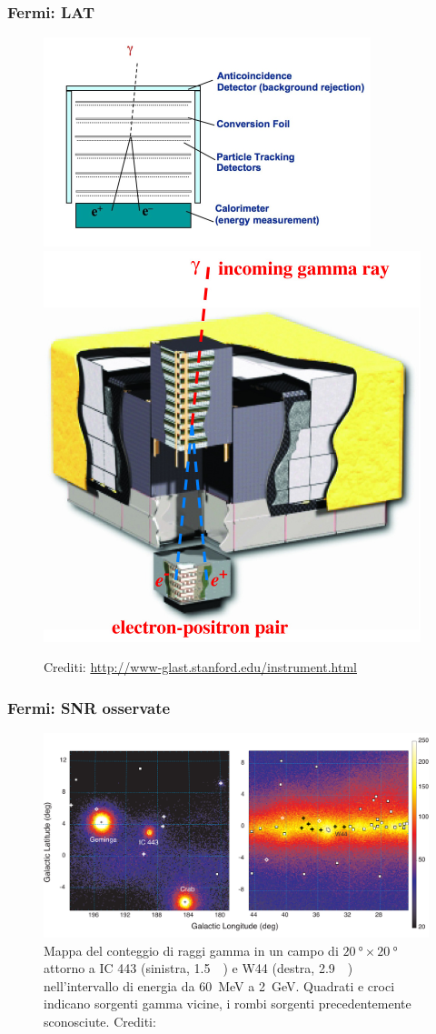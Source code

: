 \documentclass[10pt]{beamer}
\begin{document}
\begin{frame}
  \frametitle{Fermi: LAT}
  \begin{figure}
    \centering
    \includegraphics[width=0.6\columnwidth]{Gamma_telescope_schematic}
    \includegraphics[width=0.4\columnwidth]{f1}
    \caption{Crediti: \url{http://www-glast.stanford.edu/instrument.html}}
  \end{figure}
\end{frame}

\begin{frame}
  \frametitle{Fermi: SNR osservate}
  \begin{figure}
    \centering
    \includegraphics[width=0.8\columnwidth]{1231160fig1.pdf}
    \caption{Mappa del conteggio di raggi gamma in un campo di
      $\SI{20}{\degree} \times \SI{20}{\degree}$ attorno a IC 443 (sinistra,
      \SI{1.5}{\kilo \parsec}) e W44 (destra, \SI{2.9}{\kilo \parsec})
      nell'intervallo di energia da \SI{60}{\mega\electronvolt} a
      \SI{2}{\giga\electronvolt}.  Quadrati e croci indicano sorgenti gamma
      vicine, i rombi sorgenti precedentemente sconosciute.  Crediti:
      \textcite{2013Sci...339..807A}}
  \end{figure}
\end{frame}
\end{document}
